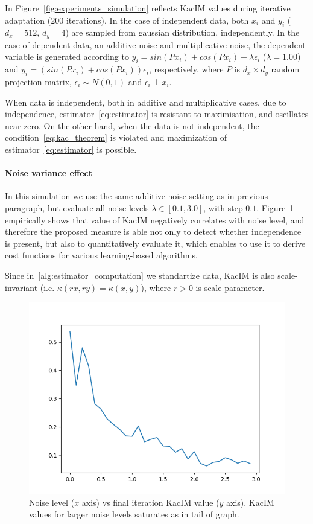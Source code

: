 \documentclass{article}
\begin{document}
In Figure~\ref{fig:experiments_simulation} reflects KacIM values during iterative adaptation ($200$ iterations). In the case of independent data, both $x_{i}$ and $y_{i}$ ($d_{x} = 512$, $d_{y} = 4$) are sampled from gaussian distribution, independently. In the case of dependent data, an additive noise and multiplicative noise, the dependent variable is generated according to $y_{i} = sin(P x_{i}) + cos(P x_{i}) + \lambda \epsilon_{i}$ ($\lambda = 1.00$) and $y_{i} = (sin(P x_{i}) + cos(P x_{i})) \epsilon_{i}$, respectively, where $P$ is $d_{x} \times d_{y}$ random projection matrix, $\epsilon_{i} \sim N(0,1)$ and $\epsilon_{i} \perp x_{i}$.

When data is independent, both in additive and multiplicative cases, due to independence, estimator~\eqref{eq:estimator} is resistant to maximisation, and oscillates near zero. On the other hand, when the data is not independent, the condition~\eqref{eq:kac_theorem} is violated and maximization of estimator~\eqref{eq:estimator} is possible.
\paragraph{Noise variance effect} In this simulation we use the same additive noise setting as in previous paragraph, but evaluate all noise levels $\lambda \in [0.1, 3.0]$, with step $0.1$.
Figure~\ref{fig:experiments_noise_level_effect} empirically shows that value of KacIM  negatively correlates with noise level, and therefore the proposed measure is able not only to detect whether independence is present, but also to quantitatively evaluate it, which enables to use it to derive cost functions for various learning-based algorithms. 

Since in~\ref{alg:estimator_computation} we standartize data, KacIM is also scale-invariant (i.e. $\kappa(rx, ry) = \kappa(x,y)$), where $r>0$ is scale parameter.

\begin{figure}[t]
	\label{fig:experiments_noise_level_effect}
	\centering
	\includegraphics[scale=0.30]{./summary_noise_effect.png}
	\caption{Noise level ($x$ axis) vs final iteration KacIM value ($y$ axis). KacIM values for larger noise levels saturates as in tail of graph.}
\end{figure}
\end{document}
